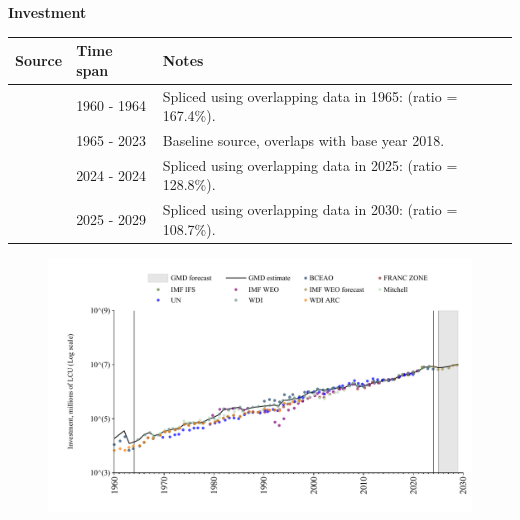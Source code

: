 \documentclass[12pt,a4paper,landscape]{article}
\begin{document}
\begin{adjustbox}{max totalsize={\paperwidth}{\paperheight},center}
\begin{minipage}[t][\textheight][t]{\textwidth}
\vspace*{0.5cm}
{}
\begin{center}
{\Large\bfseries Investment}
\end{center}
\vspace{0.5cm}
\begin{table}[H]
\centering
\small
\begin{tabular}{|l|l|l|}
\hline
\textbf{Source} & \textbf{Time span} & \textbf{Notes} \\
\hline
\rowcolor{white}\cite{BCEAO}& 1960 - 1964 &Spliced using overlapping data in 1965: (ratio = 167.4\%). \\
\rowcolor{lightgray}\cite{WDI}& 1965 - 2023 &Baseline source, overlaps with base year 2018. \\
\rowcolor{white}\cite{BCEAO}& 2024 - 2024 &Spliced using overlapping data in 2025: (ratio = 128.8\%). \\
\rowcolor{lightgray}\cite{IMF_WEO_forecast}& 2025 - 2029 &Spliced using overlapping data in 2030: (ratio = 108.7\%). \\
\hline
\end{tabular}
\end{table}
\begin{figure}[H]
\centering
\includegraphics[width=\textwidth,height=0.6\textheight,keepaspectratio]{graphs/SEN_inv.pdf}
\end{figure}
\end{minipage}
\end{adjustbox}
\end{document}

